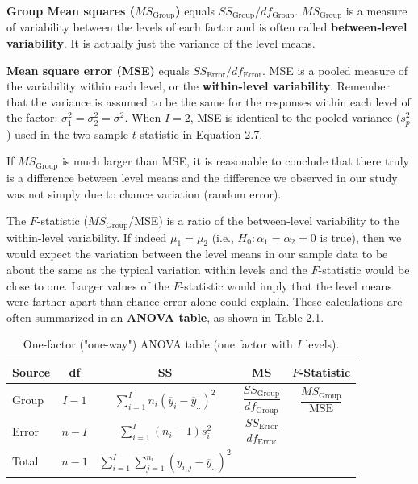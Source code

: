 \documentclass[
]{report}
\begin{document}
\textbf{Group Mean squares (\(MS_{\text{Group}}\))} equals \(SS_{\text{Group}}/df_{\text{Group}}\). \(MS_{\text{Group}}\) is a measure of variability between the levels of each factor and is often called \textbf{between-level variability}. It is actually just the variance of the level means.

\textbf{Mean square error (MSE)} equals \(SS_{\text{Error}}/df_{\text{Error}}\). MSE is a pooled measure of the variability within each level, or the \textbf{within-level variability}. Remember that the variance is assumed to be the same for the responses within each level of the factor: \(\sigma_1^2 = \sigma_2^2 = \sigma^2\). When \(I = 2\), MSE is identical to the pooled variance (\(s_p^2\)) used in the two-sample \(t\)-statistic in Equation 2.7.

If \(MS_{\text{Group}}\) is much larger than MSE, it is reasonable to conclude that there truly is a difference between level means and the difference we observed in our study was not simply due to chance variation (random error).

The \(F\)-statistic (\(MS_{\text{Group}}\)/MSE) is a ratio of the between-level variability to the within-level variability. If indeed \(\mu_1 = \mu_2\) (i.e., \(H_0\!:\! \alpha_1 = \alpha_2 = 0\) is true), then we would expect the variation between the level means in our sample data to be about the same as the typical variation within levels and the \(F\)-statistic would be close to one. Larger values of the \(F\)-statistic would imply that the level means were farther apart than chance error alone could explain. These calculations are often summarized in an \textbf{ANOVA table}, as shown in Table 2.1.

\begin{table}[!h]
\centering
\caption{\label{tab:tab2}One-factor ("one-way") ANOVA table (one factor with $I$ levels).}
\centering
\begin{tabular}[t]{lcccc}
\toprule
Source & df & SS & MS & $F$-Statistic\\
\midrule
Group & $I-1$ & $\displaystyle\sum_{i=1}^{I} n_i (\overline{y}_i - \overline{y}_{..})^2$ & $\dfrac{SS_{\text{Group}}}{df_{\text{Group}}}$ & $\dfrac{MS_{\text{Group}}}{\text{MSE}}$\\
Error & $n-I$ & $\displaystyle\sum_{i=1}^{I} (n_i-1)s_i^2$ & $\dfrac{SS_{\text{Error}}}{df_{\text{Error}}}$ & \\
Total & $n-1$ & $\displaystyle\sum_{i=1}^I \sum_{j=1}^{n_i} (y_{i,j} - \overline{y}_{..})^2$ &  & \\
\bottomrule
\end{tabular}
\end{table}
\end{document}
